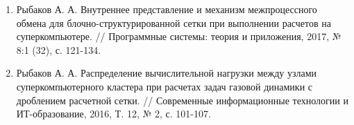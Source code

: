 \documentclass[a4paper,14pt]{extarticle}                     %
\theoremstyle{plain}                                         %
\begin{document}
\begin{enumerate}
\item Рыбаков А. А. Внутреннее представление и механизм межпроцессного обмена для блочно-структурированной сетки при выполнении расчетов на суперкомпьютере. // Программные системы: теория и приложения, 2017, № 8:1 (32), с. 121-134.
\item Рыбаков А. А. Распределение вычислительной нагрузки между узлами суперкомпьютерного кластера при расчетах задач газовой динамики с дроблением расчетной сетки. // Современные информационные технологии и ИТ-образование, 2016, Т. 12, № 2, с. 101-107.
\end{enumerate}
\end{document}
